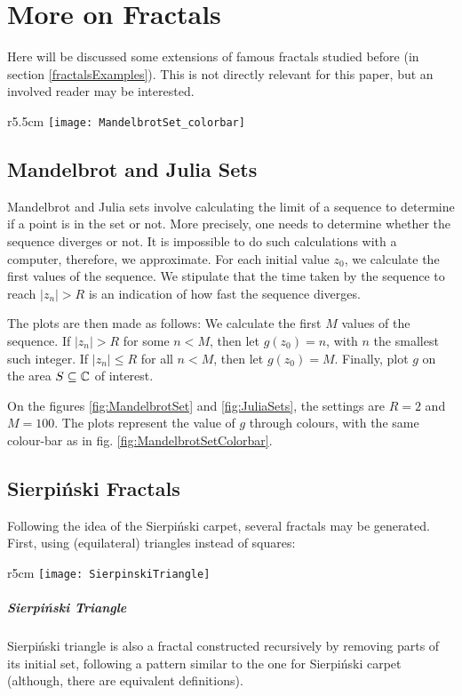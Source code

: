 \section{More on Fractals}
Here will be discussed some extensions of famous fractals studied before (in section \ref{fractalsExamples}).
This is not directly relevant for this paper, but an involved reader may be interested.

\begin{wrapfigure}{r}{5.5cm}
	\vspace{-1.5cm}
	\texttt{[image: MandelbrotSet\_colorbar]}
	\centering
	\captionsetup{justification=centering}
	\caption{Mandelbrot Set}
	\label{fig:MandelbrotSetColorbar}
\end{wrapfigure}
\subsection{Mandelbrot and Julia Sets}
Mandelbrot and Julia sets involve calculating the limit of a sequence to determine if a point is in the set or not.
More precisely, one needs to determine whether the sequence diverges or not.
It is impossible to do such calculations with a computer, therefore, we approximate.
For each initial value $z_0$, we calculate the first values of the sequence.
We stipulate that the time taken by the sequence to reach $|z_n|>R$ is an indication of how fast the sequence diverges.

The plots are then made as follows:
We calculate the first $M$ values of the sequence.
If $|z_n|>R$ for some $n<M$, then let $g(z_0) = n$, with $n$ the smallest such integer.
If $|z_n| \leq R$ for all $n<M$, then let $g(z_0) = M$.
Finally, plot $g$ on the area $S \subseteq \mathbb{C}$ of interest.

On the figures \ref{fig:MandelbrotSet} and \ref{fig:JuliaSets}, the settings are $R=2$ and $M=100$.
The plots represent the value of $g$ through colours, with the same colour-bar as in fig. \ref{fig:MandelbrotSetColorbar}.


\subsection{Sierpiński Fractals}
Following the idea of the Sierpiński carpet, several fractals may be generated.
First, using (equilateral) triangles instead of squares:

\begin{wrapfigure}{r}{5cm}
	\vspace{-0.5cm}
	\texttt{[image: SierpinskiTriangle]}
	\centering
	\captionsetup{justification=centering}
	\caption{Sierpinski Triangle (8 steps)}
	\label{fig:SierpinskiTriangle}
	\vspace{-3cm}
\end{wrapfigure}
\subparagraph{Sierpiński Triangle}
Sierpiński triangle is also a fractal constructed recursively by removing parts of its initial set, following a pattern similar to the one for Sierpiński carpet (although, there are equivalent definitions).

